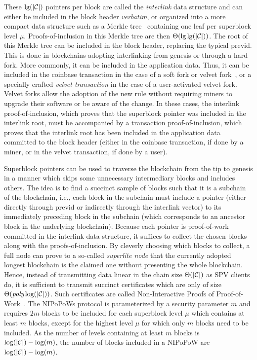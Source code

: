 These $\lg(|\mathcal{C}|)$ pointers per block are called the \emph{interlink} data
structure and can either be included in the block header \emph{verbatim}, or
organized into a more compact data structure such as a Merkle tree~\cite{merkle}
 containing one leaf per superblock level $\mu$.
Proofs-of-inclusion in this Merkle tree are then $\Theta(\lg\lg(|\mathcal{C}|))$. The
root of this Merkle tree can be included in the block header, replacing the
typical \textsf{previd}. This is done in blockchains adopting interlinking from
genesis or through a hard fork. More commonly, it can be included in the
application data. Thus, it can be included in the coinbase transaction in the
case of a soft fork or velvet fork~\cite{velvet}, or a specially crafted
\emph{velvet transaction} in the case of a user-activated velvet fork. Velvet
forks allow the adoption of the new rule without requiring miners to upgrade
their software or be aware of the change. In these cases, the interlink
proof-of-inclusion, which proves that the superblock pointer was included in the
interlink root, must be accompanied by a transaction proof-of-inclusion, which
proves that the interlink root has been included in the application data
committed to the block header (either in the coinbase transaction, if done by a
miner, or in the velvet transaction, if done by a user).

Superblock pointers can be used to traverse the blockchain from the tip to
genesis in a manner which skips some unnecessary intermediary blocks and
includes others. The idea is to find a succinct sample of blocks such that it is
a subchain of the blockchain, i.e., each block in the subchain must include a
pointer (either directly through \textsf{previd} or indirectly through the
interlink vector) to its immediately preceding block in the subchain (which
corresponds to an ancestor block in the underlying blockchain). Because each
pointer is proof-of-work committed in the interlink data structure, it suffices
to collect the chosen blocks along with the proofs-of-inclusion. By cleverly
choosing which blocks to collect, a full node can prove to a so-called
\emph{superlite node} that the currently adopted longest blockchain is the
claimed one without presenting the whole blockchain. Hence, instead of
transmitting data linear in the chain size $\Theta(|\mathcal{C}|)$ as SPV clients do,
it is sufficient to transmit succinct certificates which are only of size
$\Theta(\emph{poly}\log(|\mathcal{C}|))$. Such certificates are called Non-Interactive
Proofs of Proof-of-Work~\cite{nipopows}. The NIPoPoWs protocol is parameterized
by a security parameter $m$ and requires $2m$ blocks to be included for each
superblock level $\mu$ which contains at least $m$ blocks, except for the
highest level $\mu$ for which only $m$ blocks need to be included. As the number
of levels containing at least $m$ blocks is $\log(|\mathcal{C}|) - \log(m)$, the
number of blocks included in a NIPoPoW are $\log(|\mathcal{C}|) - \log(m)$.


